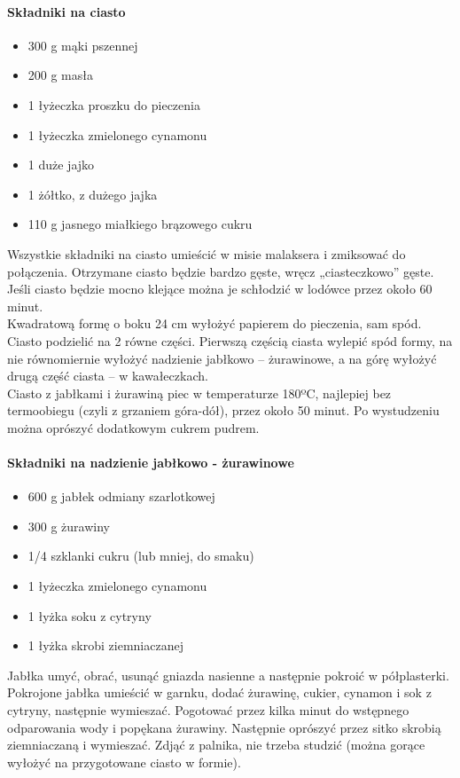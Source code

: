 \documentclass[12pt, letterpaper, titlepage]{article}
\begin{document}
\paragraph{Składniki na ciasto}
\begin{itemize}
\item 300 g mąki pszennej
\item 200 g masła
\item 1 łyżeczka proszku do pieczenia
\item 1 łyżeczka zmielonego cynamonu
\item 1 duże jajko
\item 1 żółtko, z dużego jajka
\item 110 g jasnego miałkiego brązowego cukru
\end{itemize}
Wszystkie składniki na ciasto umieścić w misie malaksera i zmiksować do połączenia. Otrzymane
ciasto będzie bardzo gęste, wręcz „ciasteczkowo” gęste. Jeśli ciasto będzie mocno klejące
można je schłodzić w lodówce przez około 60 minut. \\
\newline
Kwadratową formę o boku 24 cm wyłożyć papierem do pieczenia, sam spód. Ciasto podzielić
na 2 równe części. Pierwszą częścią ciasta wylepić spód formy, na nie równomiernie wyłożyć
nadzienie jabłkowo – żurawinowe, a na górę wyłożyć drugą część ciasta – w kawałeczkach. \\
\newline
Ciasto z jabłkami i żurawiną piec w temperaturze 180ºC, najlepiej bez termoobiegu (czyli
z grzaniem góra-dół), przez około 50 minut. Po wystudzeniu można oprószyć dodatkowym
cukrem pudrem.
\paragraph{Składniki na nadzienie jabłkowo - żurawinowe}
\begin{itemize}
\item 600 g jabłek odmiany szarlotkowej
\item 300 g żurawiny
\item 1/4 szklanki cukru (lub mniej, do smaku)
\item 1 łyżeczka zmielonego cynamonu
\item 1 łyżka soku z cytryny
\item 1 łyżka skrobi ziemniaczanej
\end{itemize}
Jabłka umyć, obrać, usunąć gniazda nasienne a następnie pokroić w półplasterki. \\
\newline
Pokrojone jabłka umieścić w garnku, dodać żurawinę, cukier, cynamon i sok z cytryny, następnie
wymieszać. Pogotować przez kilka minut do wstępnego odparowania wody i popękana
żurawiny. Następnie oprószyć przez sitko skrobią ziemniaczaną i wymieszać. Zdjąć z palnika,
nie trzeba studzić (można gorące wyłożyć na przygotowane ciasto w formie).
\newpage
\end{document}
